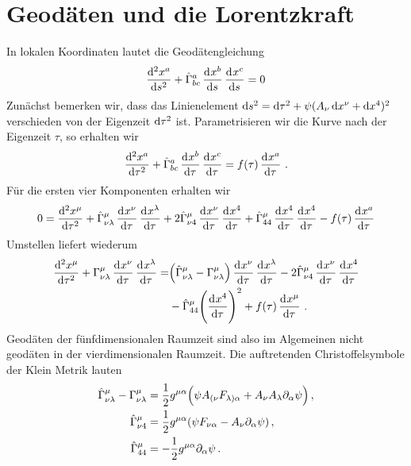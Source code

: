  \section{Geodäten und die Lorentzkraft}
In lokalen Koordinaten lautet die Geodätengleichung
\begin{equation}
\dod[2]{x^a}{s}+\fived{\Gamma}^{a}_{bc}\dod{x^b}{s}\dod{x^c}{s}=0
\end{equation}
Zunächst bemerken wir, dass das Linienelement  
$\dif s^2=\dif \tau^2+\psi(A_\nu\dif x^\nu+\dif x^4)^2$ 
verschieden von der Eigenzeit $\dif \tau^2$ ist.
Parametrisieren wir die Kurve nach der Eigenzeit $\tau$, so erhalten
wir 
\begin{equation}
\dod[2]{x^a}{\tau}+\fived{\Gamma}^{a}_{bc}\dod{x^b}{\tau}\dod{x^c}{\tau}
=f(\tau)\dod{x^a}{\tau}\,.
\end{equation}
Für die ersten vier Komponenten erhalten wir
\begin{equation}
\begin{split}
0=\dod[2]{x^\mu}{\tau}
+\fived{\Gamma}^{\mu}_{\nu\lambda}\dod{x^\nu}{\tau}\dod{x^\lambda}{\tau}
+2\fived{\Gamma}^{\mu}_{\nu 4}\dod{x^\nu}{\tau}\dod{x^4}{\tau}
+\fived{\Gamma}^{\mu}_{44}\dod{x^4}{\tau}\dod{x^4}{\tau}
-f(\tau)\dod{x^a}{\tau}\\
\end{split}
\end{equation}
Umstellen liefert wiederum
\begin{equation}
\begin{split}
\dod[2]{x^\mu}{\tau}
+\Gamma^{\mu}_{\nu\lambda}\dod{x^\nu}{\tau}\dod{x^\lambda}{\tau}
=&\left(\fived{\Gamma}^{\mu}_{\nu\lambda}-\Gamma^{\mu}_{\nu\lambda}\right)
\dod{x^\nu}{\tau}\dod{x^\lambda}{\tau}
-2\fived{\Gamma}^{\mu}_{\nu
4}\dod{x^\nu}{\tau}\dod{x^4}{\tau} \\
&-\fived{\Gamma}^{\mu}_{44}\left(\dod{x^4}{\tau}\right)^2
+f(\tau)\dod{x^\mu}{\tau}\,.\label{eq:geod4d}
\end{split}
\end{equation}
Geodäten der fünfdimensionalen Raumzeit sind also im Algemeinen nicht 
geodäten in der vierdimensionalen Raumzeit. Die
auftretenden Christoffelsymbole der Klein Metrik lauten
\begin{align}
\fived{\Gamma}^{\mu}_{\nu\lambda}-\Gamma^{\mu}_{\nu\lambda}
&=\frac{1}{2}g^{\mu\alpha}\left(\psi
A_{(\nu}F_{\lambda)\alpha}+A_{\nu}A_{\lambda}\partial_{\alpha}\psi \right)\,,
\\
\fived{\Gamma}^{\mu}_{\nu 4}
&=\frac{1}{2}g^{\mu\alpha}\left(\psi F_{\nu\alpha}-A_\nu\partial_\alpha
\psi\right)\,,\\
\fived{\Gamma}^{\mu}_{4 4}
&=-\frac{1}{2}g^{\mu\alpha}\partial_{\alpha}\psi\,.
\end{align}

